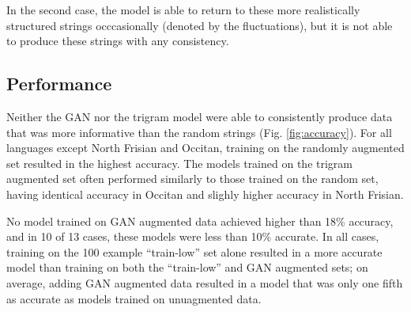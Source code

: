 \documentclass{article}
\begin{document}
      In the second case, the model is able to return to these more realistically structured strings occcasionally (denoted by the fluctuations), but it is not able to produce these strings with any consistency.

    \subsection{Performance}
      Neither the GAN nor the trigram model were able to consistently produce data that was more informative than the random strings (Fig. \ref{fig:accuracy}). For all languages except North Frisian and Occitan, training on the randomly augmented set resulted in the highest accuracy. The models trained on the trigram augmented set often performed similarly to those trained on the random set, having identical accuracy in Occitan and slighly higher accuracy in North Frisian.

      No model trained on GAN augmented data achieved higher than 18\% accuracy, and in 10 of 13 cases, these models were less than 10\% accurate. In all cases, training on the 100 example ``train-low'' set alone resulted in a more accurate model than training on both the ``train-low'' and GAN augmented sets; on average, adding GAN augmented data resulted in a model that was only one fifth as accurate as models trained on unuagmented data.
\end{document}
